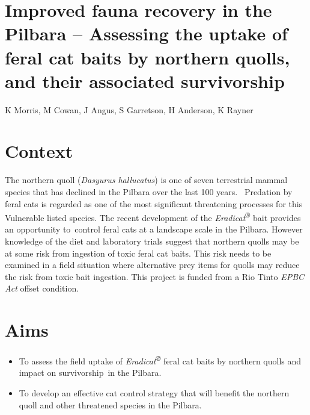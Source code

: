 \documentclass[version=last,
    paper=a4, %
    10pt, %
    usenames,
    dvipsnames,
    oneside, %
    headings=openany, %
    DIV=15 %
]{scrbook}
\begin{document}
\section*{Improved fauna recovery in the Pilbara -- Assessing the uptake of feral
cat baits by northern quolls, and their associated survivorship
}

K Morris, M Cowan, J Angus, S Garretson, H Anderson, K Rayner


\section*{Context}
The northern quoll (\emph{Dasyurus hallucatus}) is one of seven
terrestrial mammal species that has declined in the Pilbara over the
last 100 years.~ Predation by feral cats is regarded as one of the most
significant threatening processes for this Vulnerable listed species.
The recent development of the \emph{Eradicat\textsuperscript{®}} bait
provides an opportunity to~control feral cats at a landscape scale in
the Pilbara. However knowledge of the diet and laboratory trials suggest
that northern quolls may be at some risk from ingestion of toxic feral
cat baits. This risk needs to be examined in a field situation where
alternative prey items for quolls may reduce the risk from toxic bait
ingestion. This project is funded from a Rio Tinto \emph{EPBC Act}
offset condition.



\section*{Aims}
\begin{itemize}
\itemsep1pt\parskip0pt
\item
  To assess the field uptake of \emph{Eradicat\textsuperscript{®}} feral
  cat baits by northern quolls and impact on survivorship~in the
  Pilbara.
\item
  To develop an effective cat control strategy that will benefit the
  northern quoll and other threatened species in the Pilbara.
\end{itemize}
\end{document}
